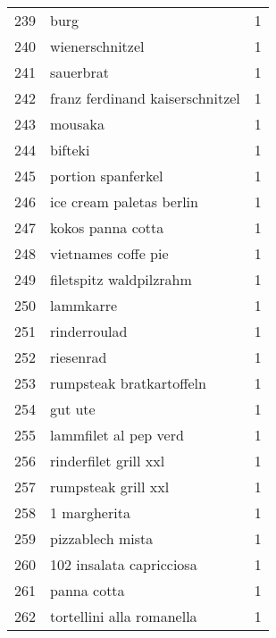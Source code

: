 \begin{tabular}{llr}
239 &                                               burg &      1 \\
240 &                                    wienerschnitzel &      1 \\
241 &                                          sauerbrat &      1 \\
242 &                    franz ferdinand kaiserschnitzel &      1 \\
243 &                                            mousaka &      1 \\
244 &                                            bifteki &      1 \\
245 &                                 portion spanferkel &      1 \\
246 &                           ice cream paletas berlin &      1 \\
247 &                                  kokos panna cotta &      1 \\
248 &                                vietnames coffe pie &      1 \\
249 &                            filetspitz waldpilzrahm &      1 \\
250 &                                          lammkarre &      1 \\
251 &                                       rinderroulad &      1 \\
252 &                                          riesenrad &      1 \\
253 &                           rumpsteak bratkartoffeln &      1 \\
254 &                                            gut ute &      1 \\
255 &                              lammfilet al pep verd &      1 \\
256 &                              rinderfilet grill xxl &      1 \\
257 &                                rumpsteak grill xxl &      1 \\
258 &                                       1 margherita &      1 \\
259 &                                   pizzablech mista &      1 \\
260 &                           102 insalata capricciosa &      1 \\
261 &                                        panna cotta &      1 \\
262 &                          tortellini alla romanella &      1 \\

\end{tabular}
